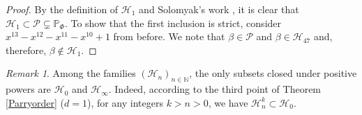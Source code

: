 \documentclass[12pt]{article}
\theoremstyle{plain}
\theoremstyle{remark}
\newtheorem{remark}[theorem]{Remark}
\begin{document}
\begin{proof}


 By the definition of $\mathcal{H}_1$ and Solomyak's work \cite{Sol94}, it is clear that $\mathcal{H}_1\subset \mathcal{P} \subsetneq \mathbb{P}_\Phi$. To show that the first inclusion is strict, consider $x^{13}-x^{12}-x^{11}-x^{10}+1$ from before. We note that $\beta \in \mathcal{P}$ and $\beta \in \mathcal{H}_{47}$ and, therefore, $\beta \not\in \mathcal{H}_1$.
\end{proof}

\begin{remark}
  Among the families  $(\mathcal{H}_n)_{n\in \mathbb{N}}$, the only subsets closed under positive powers are $\mathcal{H}_0$ and $\mathcal{H}_\infty$. Indeed, according to the third point of Theorem \ref{Parryorder} ($d=1$), for any integers $k>n>0$, we have $\mathcal{H}_n^k \subset \mathcal{H}_0 $. 
\end{remark}
\end{document}
